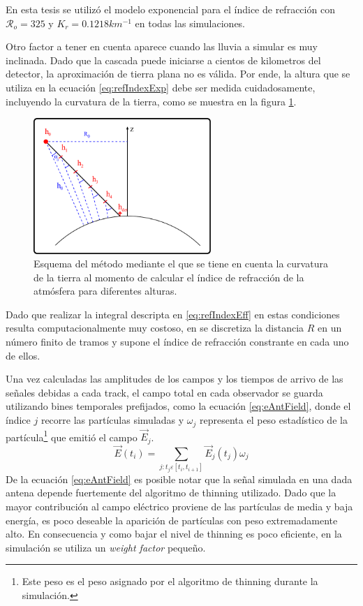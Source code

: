 		En esta tesis se utiliz\'o el modelo exponencial para el \'indice de refracci\'on con ${\mathcal R}_o=325$ y $K_r=0.1218km^{-1}$ en todas las simulaciones.
		
		Otro factor a tener en cuenta aparece cuando las lluvia a simular es muy inclinada.
		Dado que la cascada puede iniciarse a cientos de kilometros del detector, la aproximaci\'on de tierra plana no es v\'alida.
		Por ende, la altura que se utiliza en la ecuaci\'on \ref{eq:refIndexExp} debe ser medida cuidadosamente, incluyendo la curvatura de la tierra, como se muestra en la figura \ref{fig:refIndex}.
		\begin{figure}[ht!]
		\centering
			\includegraphics[width=0.6\textwidth]{fig/simulacionRadio/refIndex}
			\caption{\label{fig:refIndex} Esquema del m\'etodo mediante el que se tiene en cuenta la curvatura de la tierra al momento de calcular el \'indice de refracci\'on de la atm\'osfera para diferentes alturas.}
		\end{figure}
		Dado que realizar la integral descripta en \ref{eq:refIndexEff} en estas condiciones resulta computacionalmente muy costoso, en \zhs{} se discretiza la distancia $R$ en un n\'umero finito de tramos y supone el \'indice de refracci\'on constrante en cada uno de ellos.
		
		Una vez calculadas las amplitudes de los campos y los tiempos de arrivo de las se\~nales debidas a cada track, el campo total en cada observador se guarda utilizando bines temporales prefijados, como la ecuaci\'on \ref{eq:eAntField}, donde el \'indice $j$ recorre las part\'iculas simuladas y $\omega_j$ representa el peso estad\'istico de la part\'icula\footnote{Este peso es el peso asignado por el algoritmo de thinning durante la simulaci\'on.} que emiti\'o el campo $\vec{E}_j$.
		\begin{equation}
		\vec{E}(t_i)=\sum_{j:t_j\varepsilon[t_i,t_{i+1}]}\vec{E}_j(t_j)\omega_j
		\label{eq:eAntField}
		\end{equation}
		De la ecuaci\'on \ref{eq:eAntField} es posible notar que la se\~nal simulada en una dada antena depende fuertemente del algoritmo de thinning utilizado. 
		Dado que la mayor contribuci\'on al campo el\'ectrico proviene de las part\'iculas de media y baja energ\'ia, es poco deseable la aparici\'on de partículas con peso extremadamente alto.
		En consecuencia y como bajar el nivel de thinning es poco eficiente, en la simulación se utiliza un \emph{weight factor} peque\~no.
		
